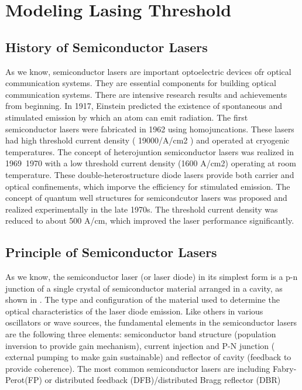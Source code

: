 \chapter{Modeling Lasing Threshold} \label{LT}


\section{History of Semiconductor Lasers} \label{corrections} As we know,
semiconductor lasers are important optoelectric devices ofr optical
communication systems. They are essential components for building optical
communication systems. There are intensive research results and achievements
from beginning.  In 1917, Einstein predicted the existence of spontaneous and
stimulated emission by which an atom can emit radiation. The first
semiconductor lasers were fabricated in 1962 using homojuncations. These lasers
had high threshold current density ( 19000/A/cm2 ) and operated at cryogenic
temperatures.  The concept of heterojuntion semiconductor lasers was realized
in 1969~1970 with a low threshold current density (1600 A/cm2) operating at
room temperature. These double-heterostructure diode lasers provide both
carrier and optical confinements, which imporve the efficiency for stimulated
emission.  The concept of quantum well structures for semicondcutor lasers was
proposed and realized experimentally in the late 1970s. The threshold current
density was reduced to about 500 A/cm, which improved the laser performance
significantly.

\section{Principle of Semiconductor Lasers} \label{corrections}

As we know, the semiconductor laser (or laser diode) in its simplest form is a
p-n junction of a single crystal of semiconductor material arranged in a
cavity, as shown in . The type and configuration of the material used to
determine the optical characteristics of the laser diode emission. Like others
in various oscillators or wave sources, the fundamental elements in the
semiconductor lasers are the following three elements: semiconductor band
structure (population inversion to provide gain mechanism), current injection
and P-N junction ( external pumping to make gain sustainable) and reflector of
cavity (feedback to provide coherence). The most common semiconductor lasers
are including Fabry-Perot(FP) or distributed feedback (DFB)/distributed Bragg
reflector (DBR) 

